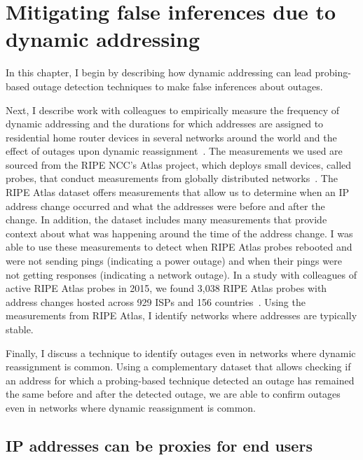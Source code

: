 
\chapter{Mitigating false inferences due to dynamic addressing}

\label{cpt:addr_change}


In this chapter, I begin by describing how dynamic addressing can lead
probing-based outage detection techniques to make false inferences
about outages. 

Next, I describe work with colleagues to empirically
measure the frequency of dynamic addressing and the durations for
which addresses are assigned to residential home router devices in
several networks around the world and the effect of outages upon
dynamic reassignment~\cite{addrchange-reasons}. The measurements we
used are sourced from the RIPE NCC's Atlas project, which deploys small devices, called probes, that
conduct measurements from globally distributed
networks~\cite{atlas}. The RIPE Atlas dataset offers measurements that allow us to
determine when an IP address change occurred and what the addresses
were before and after the change. In addition, the dataset includes many
measurements that provide context about what was happening around the
time of the address change. I was able to use these measurements to
detect when RIPE Atlas probes rebooted and were not sending pings
(indicating a power outage) and when their pings were not getting
responses (indicating a network outage). In a study with colleagues of active RIPE
Atlas probes in 2015, we found 3,038 RIPE Atlas probes with address
changes hosted across 929 ISPs and 156
countries~\cite{addrchange-reasons}. Using the measurements from RIPE Atlas, I identify networks
where addresses are typically stable. 

Finally, I discuss a technique to identify outages even in networks
where dynamic reassignment is common. Using a complementary dataset
that allows checking if an address for which a probing-based technique
detected an outage has remained the same before and after the detected
outage, we are able to confirm outages even in networks where dynamic
reassignment is common.

\section{IP addresses can be proxies for end users}

